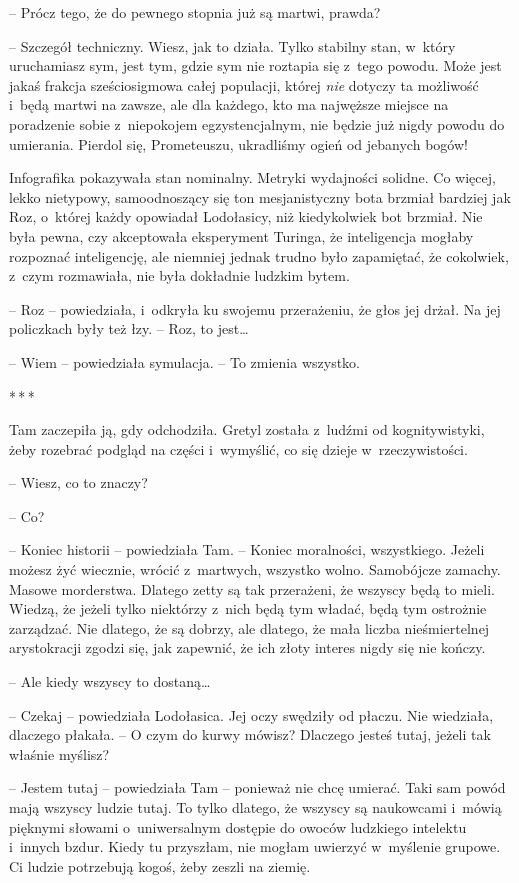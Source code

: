 \documentclass[oneside,polish,11pt,sfheadings]{mwbk}
\newcommand{\threeast}{\bigskip\par\centerline{*\,*\,*}\medskip\par}
\begin{document}
-- Prócz tego, że do pewnego stopnia już są martwi, prawda?

-- Szczegół techniczny. Wiesz, jak to działa. Tylko stabilny stan, w~który uruchamiasz sym, jest tym, gdzie sym nie roztapia się z~tego
powodu. Może jest jakaś frakcja sześciosigmowa całej populacji, której
\textit{nie} dotyczy ta możliwość i~będą martwi na zawsze, ale dla
każdego, kto ma najwęższe miejsce na poradzenie sobie z~niepokojem
egzystencjalnym, nie będzie już nigdy powodu do umierania. Pierdol się,
Prometeuszu, ukradliśmy ogień od jebanych bogów!

Infografika pokazywała stan nominalny. Metryki wydajności solidne. Co
więcej, lekko nietypowy, samoodnoszący się ton mesjanistyczny bota
brzmiał bardziej jak Roz, o~której każdy opowiadał Lodołasicy, niż
kiedykolwiek bot brzmiał. Nie była pewna, czy akceptowała eksperyment
Turinga, że inteligencja mogłaby rozpoznać inteligencję, ale niemniej
jednak trudno było zapamiętać, że cokolwiek, z~czym rozmawiała, nie była
dokładnie ludzkim bytem.

-- Roz -- powiedziała, i~odkryła ku swojemu przerażeniu, że głos jej
drżał. Na jej policzkach były też łzy. -- Roz, to jest\ldots 

-- Wiem -- powiedziała symulacja. -- To zmienia wszystko.

\threeast

Tam zaczepiła ją, gdy odchodziła. Gretyl została z~ludźmi od
kognitywistyki, żeby rozebrać podgląd na części i~wymyślić, co się
dzieje w~rzeczywistości.

-- Wiesz, co to znaczy?

-- Co?

-- Koniec historii -- powiedziała Tam. -- Koniec moralności, wszystkiego.
Jeżeli możesz żyć wiecznie, wrócić z~martwych, wszystko wolno.
Samobójcze zamachy. Masowe morderstwa. Dlatego zetty są tak przerażeni,
że wszyscy będą to mieli. Wiedzą, że jeżeli tylko niektórzy z~nich będą
tym władać, będą tym ostrożnie zarządzać. Nie dlatego, że są dobrzy, ale
dlatego, że mała liczba nieśmiertelnej arystokracji zgodzi się, jak
zapewnić, że ich złoty interes nigdy się nie kończy.

-- Ale kiedy wszyscy to dostaną\ldots 

-- Czekaj -- powiedziała Lodołasica. Jej oczy swędziły od płaczu. Nie
wiedziała, dlaczego płakała. -- O czym do kurwy mówisz? Dlaczego jesteś
tutaj, jeżeli tak właśnie myślisz?

-- Jestem tutaj -- powiedziała Tam -- ponieważ nie chcę umierać. Taki sam
powód mają wszyscy ludzie tutaj. To tylko dlatego, że wszyscy są
naukowcami i~mówią pięknymi słowami o~uniwersalnym dostępie do owoców
ludzkiego intelektu i~innych bzdur. Kiedy tu przyszłam, nie mogłam
uwierzyć w~myślenie grupowe. Ci ludzie potrzebują kogoś, żeby zeszli na
ziemię.
\end{document}
